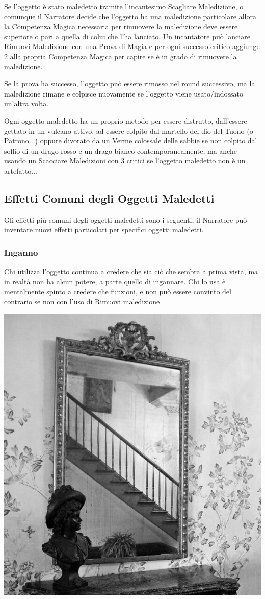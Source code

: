 \begin{multicols}{2}
	Se l'oggetto è stato maledetto tramite l'incantesimo Scagliare Maledizione, o comunque il Narratore decide che l'oggetto ha una maledizione particolare allora la Competenza Magica necessaria per rimuovere la maledizione deve essere superiore o pari a quella di colui che l'ha lanciato.
	Un incantatore può lanciare Rimuovi Maledizione con una Prova di Magia e per ogni successo critico aggiunge 2 alla propria Competenza Magica per capire se è in grado di rimuovere la maledizione.

	Se la prova ha successo, l'oggetto può essere rimosso nel round successivo, ma la maledizione rimane e colpisce nuovamente se l'oggetto viene usato/indossato un'altra volta.

	Ogni oggetto maledetto ha un proprio metodo per essere distrutto, dall'essere gettato in un vulcano attivo, ad essere colpito dal martello del dio del Tuono (o Patrono...) oppure divorato da un Verme colossale delle sabbie se non colpito dal soffio di un drago rosso e un drago bianco contemporaneamente, ma anche usando un Scacciare Maledizioni con 3 critici se l'oggetto maledetto non è un artefatto...

	\subsection{Effetti Comuni degli Oggetti Maledetti}

	Gli effetti più comuni degli oggetti maledetti sono i seguenti, il Narratore può inventare nuovi effetti particolari per specifici oggetti maledetti.

	\subsubsection{Inganno}

	Chi utilizza l'oggetto continua a credere che sia ciò che sembra a prima vista, ma in realtà non ha alcun potere, a parte quello di ingannare. Chi lo usa è mentalmente spinto a credere che funzioni, e non può essere convinto del contrario se non con l'uso di Rimuovi maledizione

	\begin{center}
		\includegraphics[width=0.70\linewidth]{immagini/mirror.png}


\end{center}
\end{multicols}
